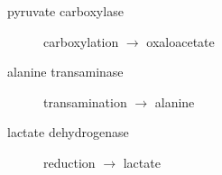 \documentclass{scrartcl}
\begin{document}

\begin{description}
\item[{pyruvate carboxylase}] carboxylation \(\to\) oxaloacetate
\end{description}


\begin{description}
\item[{alanine transaminase}] transamination \(\to\) alanine
\end{description}


\begin{description}
\item[{lactate dehydrogenase}] reduction \(\to\) lactate
\end{description}

\end{document}
